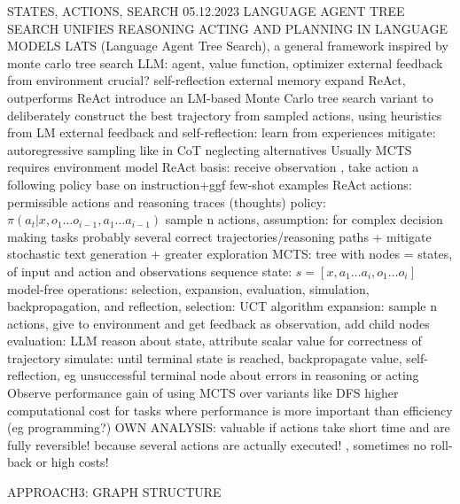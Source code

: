 \documentclass{article}
\begin{document}
STATES, ACTIONS, SEARCH
\cite{zhou_language_2023} 05.12.2023 LANGUAGE AGENT TREE SEARCH UNIFIES REASONING ACTING AND PLANNING IN LANGUAGE MODELS
LATS (Language Agent Tree Search), a general framework
inspired by monte carlo tree search
LLM: agent, value function, optimizer
external feedback from environment crucial?
self-reflection
external memory
expand ReAct, outperforms ReAct
introduce an LM-based Monte Carlo tree search variant to deliberately construct the best trajectory from sampled actions, using heuristics from LM
external feedback and self-reflection: learn from experiences
mitigate: autoregressive sampling like in CoT neglecting alternatives
Usually MCTS requires environment model
ReAct basis: receive observation , take action a following policy base on instruction+ggf few-shot examples
ReAct actions: permissible actions and reasoning traces (thoughts)
policy: $\pi(a_{t} | x, o_{1} \ldots o_{i-1}, a_{1} \ldots a_{i-1})$
sample n actions, assumption: for complex decision making tasks probably several correct trajectories/reasoning paths + mitigate stochastic text generation + greater exploration
MCTS: tree with nodes = states, of input and action and observations sequence
state: $s = [x, a_{1} \ldots a_{i}, o_{1} \ldots o_{i}]$
model-free
operations: selection, expansion, evaluation, simulation, backpropagation, and reflection,
selection: UCT algorithm
expansion: sample n actions, give to environment and get feedback as observation, add child nodes
evaluation: LLM reason about state, attribute scalar value for correctness of trajectory
simulate: until terminal state is reached, backpropagate value, self-reflection, eg unsuccessful terminal node about errors in reasoning or acting
Observe performance gain of using MCTS over variants like DFS
higher computational cost
for tasks where performance is more important than efficiency (eg programming?)
OWN ANALYSIS: valuable if actions take short time and are fully reversible! because several actions are actually executed! , sometimes no roll-back or high costs!

APPROACH3: GRAPH STRUCTURE
\end{document}
